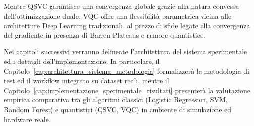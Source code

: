 Mentre QSVC garantisce una convergenza globale grazie alla natura convessa dell'ottimizzazione duale, VQC offre una flessibilità parametrica vicina alle architetture Deep Learning tradizionali, al prezzo di sfide legate alla convergenza del gradiente in presenza di Barren Plateaus e rumore quantistico.

Nei capitoli successivi verranno delineate l'architettura del sistema sperimentale ed i dettagli dell'implementazione. In particolare, il Capitolo~\ref{cap:architettura_sistema_metodologia} formalizzerà la metodologia di test ed il workflow integrato su dataset reali, mentre il Capitolo~\ref{cap:implementazione_sperimentale_risultati} presenterà la valutazione empirica comparativa tra gli algoritmi classici (Logistic Regression, SVM, Random Forest) e quantistici (QSVC, VQC) in ambiente di simulazione ed hardware reale.



